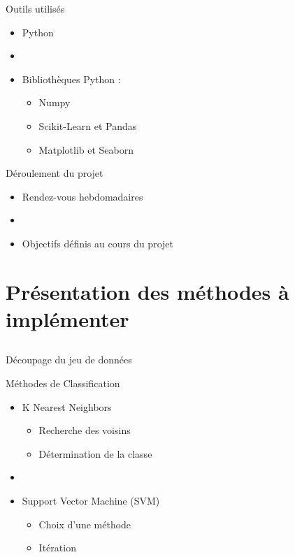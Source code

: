 \documentclass{beamer}
\begin{document}
\begin{frame}{Outils utilisés}
  \begin{itemize}
    \item Python
    \item[]
    \item Bibliothèques Python :
    \begin{itemize}
      \item Numpy
      \item Scikit-Learn et Pandas
      \item Matplotlib et Seaborn
    \end{itemize}
  \end{itemize}
\end{frame}

\begin{frame}{Déroulement du projet}
  \begin{itemize}
    \item Rendez-vous hebdomadaires
    \item[]
    \item Objectifs définis au cours du projet
  \end{itemize}
\end{frame}

\section[Méthodes]{Présentation des méthodes à implémenter}

\subsection*{}

\begin{frame}{Découpage du jeu de données}
  \begin{center}
  \end{center}
\end{frame}

\begin{frame}{Méthodes de Classification}
  \begin{itemize}
    \item K Nearest Neighbors
    \begin{itemize}
      \item Recherche des voisins
      \item Détermination de la classe
    \end{itemize}
    \item[]
    \item Support Vector Machine (SVM)
    \begin{itemize}
      \item Choix d'une méthode
      \item Itération
    \end{itemize}
  \end{itemize}
\end{frame}
\end{document}

